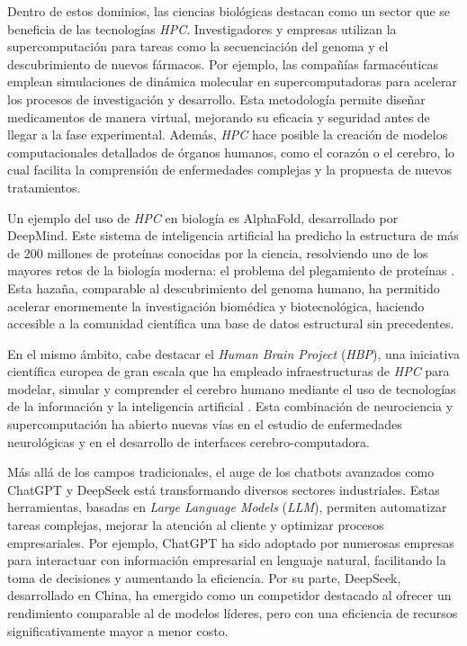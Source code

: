 Dentro de estos dominios, las ciencias biológicas destacan como un sector que se beneficia de las tecnologías \textit{HPC}. Investigadores y empresas utilizan la supercomputación para tareas como la secuenciación del genoma y el descubrimiento de nuevos fármacos. Por ejemplo, las compañías farmacéuticas emplean simulaciones de dinámica molecular en supercomputadoras para acelerar los procesos de investigación y desarrollo. Esta metodología permite diseñar medicamentos de manera virtual, mejorando su eficacia y seguridad antes de llegar a la fase experimental. Además, \textit{HPC} hace posible la creación de modelos computacionales detallados de órganos humanos, como el corazón o el cerebro, lo cual facilita la comprensión de enfermedades complejas y la propuesta de nuevos tratamientos.

Un ejemplo del uso de \textit{HPC} en biología es AlphaFold, desarrollado por DeepMind. Este sistema de inteligencia artificial ha predicho la estructura de más de 200 millones de proteínas conocidas por la ciencia, resolviendo uno de los mayores retos de la biología moderna: el problema del plegamiento de proteínas \cite{ref3}. Esta hazaña, comparable al descubrimiento del genoma humano, ha permitido acelerar enormemente la investigación biomédica y biotecnológica, haciendo accesible a la comunidad científica una base de datos estructural sin precedentes.

En el mismo ámbito, cabe destacar el \textit{Human Brain Project} (\textit{HBP}), una iniciativa científica europea de gran escala que ha empleado infraestructuras de \textit{HPC} para modelar, simular y comprender el cerebro humano mediante el uso de tecnologías de la información y la inteligencia artificial \cite{ref4}. Esta combinación de neurociencia y supercomputación ha abierto nuevas vías en el estudio de enfermedades neurológicas y en el desarrollo de interfaces cerebro-computadora.

Más allá de los campos tradicionales, el auge de los chatbots avanzados como ChatGPT y DeepSeek está transformando diversos sectores industriales. Estas herramientas, basadas en \textit{Large Language Models} (\textit{LLM}), permiten automatizar tareas complejas, mejorar la atención al cliente y optimizar procesos empresariales. Por ejemplo, ChatGPT ha sido adoptado por numerosas empresas para interactuar con información empresarial en lenguaje natural, facilitando la toma de decisiones y aumentando la eficiencia. Por su parte, DeepSeek, desarrollado en China, ha emergido como un competidor destacado al ofrecer un rendimiento comparable al de modelos líderes, pero con una eficiencia de recursos significativamente mayor a menor costo.

